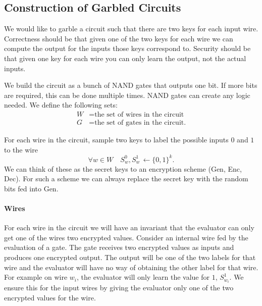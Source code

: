 
\subsection{Construction of Garbled Circuits}

We would like to garble a circuit such that there are two keys for each input wire.
Correctness should be that 
given one of the two keys for each wire we can compute the output for the inputs those keys correspond to.
Security should be that 
given one key for each wire you can only learn the output, not the actual inputs.


We build the circuit as a bunch of NAND gates that outputs one bit. 
If more bits are required, this can be done multiple times.
NAND gates can create any logic needed. 
We define the following sets:
\begin{align*}
W &= \text{the set of wires in the circuit}\\
G &= \text{the set of gates in the circuit.}
\end{align*}

For  each wire in the circuit, sample two keys
to label the possible inputs $0$ and $1$  to the wire
\[
\forall w \in W  \quad S_w^0, S_w^1 \,  \leftarrow{} \{0,1\}^k.
\]
We can think of these as the secret keys to an encryption scheme
(Gen, Enc, Dec).
For such a scheme we can always replace the secret key with the random bits fed into Gen.


\paragraph{Wires}
For each wire in the circuit we will have an invariant that the evaluator can only get one of the wires two encrypted values.
Consider an internal wire fed by the evaluation of a gate. The gate receives two encrypted values as inputs
and produces one encrypted output. The output will be one of the two labels for that wire and the evaluator will have no 
way of obtaining the other label for that wire. 
For example on wire $w_i$, the evaluator will only learn the value for $1$,  $S_{w_i}^1$.
We ensure this for the input wires by giving the evaluator only one of the two encrypted values for the wire.

